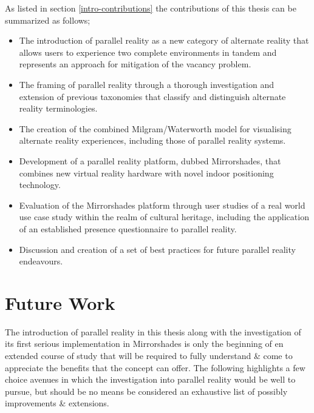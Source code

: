 As listed in section \ref{intro-contributions} the contributions of this thesis can be summarized as follows;

\begin{itemize}
	\item The introduction of parallel reality as a new category of alternate reality that allows users to experience two complete environments in tandem and represents an approach for mitigation of the vacancy problem.
	\item The framing of parallel reality through a thorough investigation and extension of previous taxonomies that classify and distinguish alternate reality terminologies.
	\item The creation of the combined Milgram/Waterworth model for visualising alternate reality experiences, including those of parallel reality systems.
	\item Development of a parallel reality platform, dubbed Mirrorshades, that combines new virtual reality hardware with novel indoor positioning technology.
	\item Evaluation of the Mirrorshades platform through user studies of a real world use case study within the realm of cultural heritage, including the application of an established presence questionnaire to parallel reality.
	\item Discussion and creation of a set of best practices for future parallel reality endeavours.
\end{itemize}


\section{Future Work}

The introduction of parallel reality in this thesis along with the investigation of its first serious implementation in Mirrorshades is only the beginning of en extended course of study that will be required to fully understand \& come to appreciate the benefits that the concept can offer. The following highlights a few choice avenues in which the investigation into parallel reality would be well to pursue, but should be no means be considered an exhaustive list of possibly improvements \& extensions.

